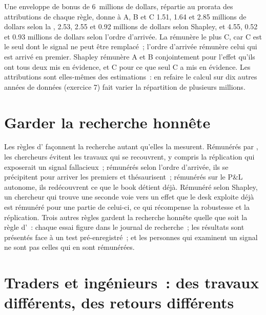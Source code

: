 Une enveloppe de bonus de 6~millions de dollars, répartie au prorata des attributions de chaque règle, donne à A, B et C 1.51, 1.64 et 2.85 millions de dollars selon la , 2.53,
2.55 et 0.92 millions de dollars selon Shapley, et 4.55, 0.52 et 0.93 millions de dollars selon l'ordre d'arrivée. La  rémunère le plus C, car C est le seul
dont le signal ne peut être remplacé~; l'ordre d'arrivée rémunère celui qui est arrivé en premier. Shapley rémunère A et B conjointement pour l'effet qu'ils ont tous deux mis en évidence, et C
pour ce que seul C a mis en évidence. Les attributions sont elles-mêmes des estimations~: en refaire le calcul sur dix autres années de données (exercice 7) fait varier la répartition de plusieurs millions.

\section{Garder la recherche honnête}

Les règles d' façonnent la recherche autant qu'elles la mesurent. Rémunérés par , les chercheurs évitent les travaux qui se recouvrent, y compris la réplication
qui exposerait un signal fallacieux~; rémunérés selon l'ordre d'arrivée, ils se précipitent pour arriver les premiers et thésaurisent~; rémunérés sur le P\&L autonome, ils redécouvrent ce que le
book détient déjà. Rémunéré selon Shapley, un chercheur qui trouve une seconde voie vers un effet que le desk exploite déjà est rémunéré pour une partie de celui-ci, ce qui
récompense la robustesse et la réplication. Trois autres règles gardent la recherche honnête quelle que soit la règle d'~: chaque essai figure dans le journal de recherche~;
les résultats sont présentés face à un test pré-enregistré~; et les personnes qui examinent un signal ne sont pas celles qui en sont rémunérées.

\section{Traders et ingénieurs~: des travaux différents, des retours différents}

